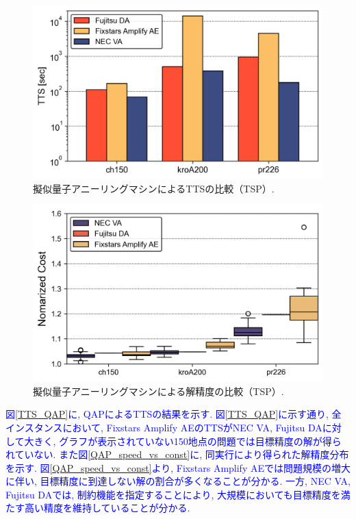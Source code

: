 \documentclass[submit,techrep,noauthor]{ipsj}
\begin{document}
\begin{figure}[ht]
\centering
\includegraphics[bb=0 0 700 230, width=15cm]{TTS_TSP.png}
\caption{擬似量子アニーリングマシンによるTTSの比較（TSP）.}
\label{TTS_TSP}
\end{figure}

\begin{figure}[ht]
\centering
\includegraphics[bb=0 0 700 230, width=15cm]{speed_vs_constraint_TSP.png}
\caption{擬似量子アニーリングマシンによる解精度の比較（TSP）.}
\label{TSP_speed_vs_const}
\end{figure}

\textcolor{blue}{図\ref{TTS_QAP}に, QAPによるTTSの結果を示す. 図\ref{TTS_QAP}に示す通り, 全インスタンスにおいて, Fixstars Amplify AEのTTSがNEC VA, Fujitsu DAに対して大きく, グラフが表示されていない150地点の問題では目標精度の解が得られていない. また図\ref{QAP_speed_vs_const}に, 同実行により得られた解精度分布を示す. 図\ref{QAP_speed_vs_const}より, Fixstars Amplify AEでは問題規模の増大に伴い, 目標精度に到達しない解の割合が多くなることが分かる. 一方, NEC VA, Fujitsu DAでは, 制約機能を指定することにより, 大規模においても目標精度を満たす高い精度を維持していることが分かる.}
\end{document}
